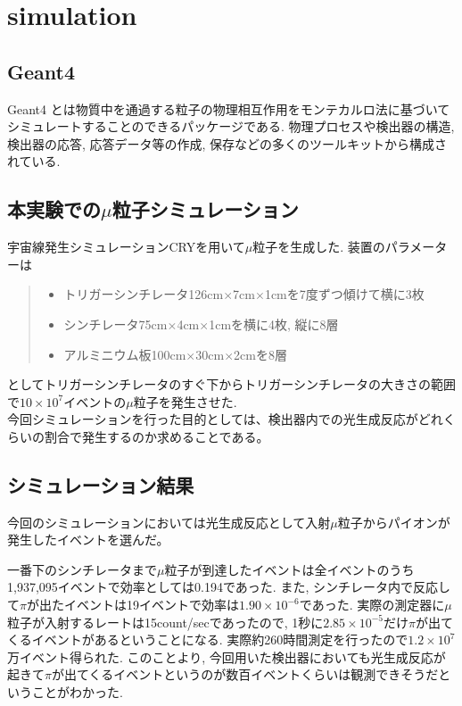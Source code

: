 \chapter{simulation}\label{simulation}
\section{Geant4}
Geant4 とは物質中を通過する粒子の物理相互作用をモンテカルロ法に基づいてシミュレートすることのできるパッケージである.
物理プロセスや検出器の構造, 検出器の応答, 応答データ等の作成, 保存などの多くのツールキットから構成されている.

\section{本実験での$\mu$粒子シミュレーション}
宇宙線発生シミュレーションCRYを用いて$\mu$粒子を生成した.
装置のパラメーターは
    \begin{quote}
        \begin{itemize}
            \item トリガーシンチレータ126cm$\times$7cm$\times$1cmを7度ずつ傾けて横に3枚
            \item シンチレータ75cm$\times$4cm$\times$1cmを横に4枚, 縦に8層
            \item アルミニウム板100cm$\times$30cm$\times$2cmを8層
        \end{itemize}
    \end{quote}
としてトリガーシンチレータのすぐ下からトリガーシンチレータの大きさの範囲で$10 \times10^{7}$イベントの$\mu$粒子を発生させた.
\\
今回シミュレーションを行った目的としては、検出器内での光生成反応がどれくらいの割合で発生するのか求めることである。

\section{シミュレーション結果}
今回のシミュレーションにおいては光生成反応として入射$\mu$粒子からパイオンが発生したイベントを選んだ。

一番下のシンチレータまで$\mu$粒子が到達したイベントは全イベントのうち1,937,095イベントで効率としては0.194であった.
また, シンチレータ内で反応して$\pi$が出たイベントは19イベントで効率は$1.90 \times10^{-6}$であった.
実際の測定器に$\mu$粒子が入射するレートは15count/secであったので, 1秒に$2.85 \times10^{-5}$だけ$\pi$が出てくるイベントがあるということになる.
実際約260時間測定を行ったので$1.2 \times10^{7}$万イベント得られた.
このことより, 今回用いた検出器においても光生成反応が起きて$\pi$が出てくるイベントというのが数百イベントくらいは観測できそうだということがわかった.

